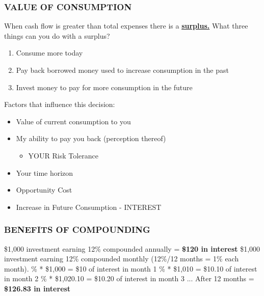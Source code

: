 \documentclass[12pt]{article}
\begin{document}
            \subsubsection{VALUE OF CONSUMPTION}
                When cash flow is greater than total expenses there is a \textbf{\underline{surplus.}}
                \newline What three things can you do with a surplus?
                \begin{enumerate}
                    \item Consume more today
                    \item Pay back borrowed money used to increase consumption in the past
                    \item Invest money to pay for more consumption in the future
                \end{enumerate}
                Factors that influence this decision:
                    \begin{itemize}
                        \item Value of current consumption to you
                        \item My ability to pay you back (perception thereof)
                            \begin{itemize}
                                \item YOUR Risk Tolerance
                            \end{itemize}
                        \item Your time horizon
                        \item Opportunity Cost
                        \item Increase in Future Consumption - INTEREST
                    \end{itemize}
            \subsubsection{BENEFITS OF COMPOUNDING}
                \$1,000 investment earning 12\% compounded annually = \textbf{\$120 in interest}    
                \newline
                \newline \$1,000 investment earning 12\% compounded monthly (12\%/12 months = 1\% each month).
                \% * \$1,000 = \$10 of interest in month 1
                \% * \$1,010 = \$10.10 of interest in month 2
                \% * \$1,020.10 = \$10.20 of interest in month 3
                \newline ...
                \newline After 12 months = \textbf{\$126.83 in interest}
\end{document}
